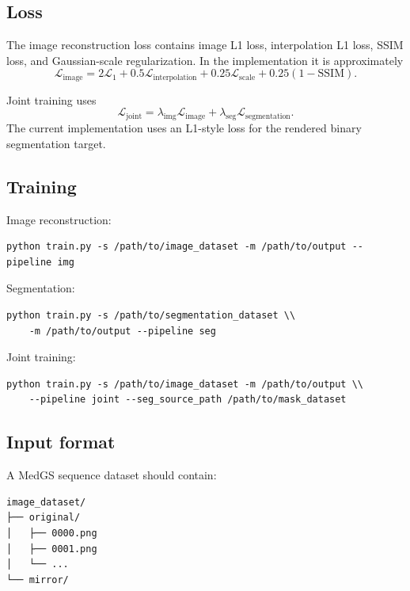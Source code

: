 \documentclass[11pt,a4paper]{article}
\begin{document}
\subsection{Loss}
The image reconstruction loss contains image L1 loss, interpolation L1 loss, SSIM loss, and Gaussian-scale regularization. In the implementation it is approximately
\begin{equation}
    \mathcal{L}_{\mathrm{image}}
    = 2\mathcal{L}_{1}
    + 0.5\mathcal{L}_{\mathrm{interpolation}}
    + 0.25\mathcal{L}_{\mathrm{scale}}
    + 0.25(1-\mathrm{SSIM}).
\end{equation}

Joint training uses
\begin{equation}
    \mathcal{L}_{\mathrm{joint}}
    = \lambda_{\mathrm{img}}\mathcal{L}_{\mathrm{image}}
    + \lambda_{\mathrm{seg}}\mathcal{L}_{\mathrm{segmentation}}.
\end{equation}
The current implementation uses an L1-style loss for the rendered binary segmentation target.

\subsection{Training}
Image reconstruction:
\begin{verbatim}
python train.py -s /path/to/image_dataset -m /path/to/output --pipeline img
\end{verbatim}

Segmentation:
\begin{verbatim}
python train.py -s /path/to/segmentation_dataset \\
    -m /path/to/output --pipeline seg
\end{verbatim}

Joint training:
\begin{verbatim}
python train.py -s /path/to/image_dataset -m /path/to/output \\
    --pipeline joint --seg_source_path /path/to/mask_dataset
\end{verbatim}

\subsection{Input format}
A MedGS sequence dataset should contain:
\begin{verbatim}
image_dataset/
├── original/
│   ├── 0000.png
│   ├── 0001.png
│   └── ...
└── mirror/
\end{verbatim}
\end{document}
